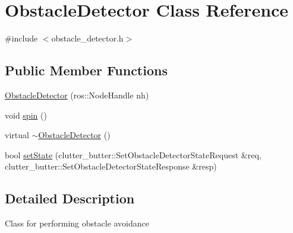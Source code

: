 \hypertarget{classObstacleDetector}{\section{Obstacle\-Detector Class Reference}
\label{classObstacleDetector}
}


{\ttfamily \#include $<$obstacle\-\_\-detector.\-h$>$}

\subsection*{Public Member Functions}
\begin{DoxyCompactItemize}
\item 
\hyperlink{classObstacleDetector_a15db5b43cb18f49d392ea7c9d22b182d}{Obstacle\-Detector} (ros\-::\-Node\-Handle nh)
\item 
void \hyperlink{classObstacleDetector_abeeaf5eaf14c31307a73748aedaf957a}{spin} ()
\item 
virtual \hyperlink{classObstacleDetector_aa3b42649fc5c973f677a4aba968d25cc}{$\sim$\-Obstacle\-Detector} ()
\item 
bool \hyperlink{classObstacleDetector_a8b178b3e7005d5f9d5c593f210354d80}{set\-State} (clutter\-\_\-butter\-::\-Set\-Obstacle\-Detector\-State\-Request \&req, clutter\-\_\-butter\-::\-Set\-Obstacle\-Detector\-State\-Response \&resp)
\end{DoxyCompactItemize}


\subsection{Detailed Description}
Class for performing obstacle avoidance 

